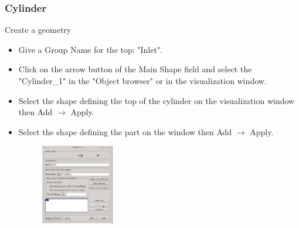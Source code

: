 \documentclass[10pt, hyperref={unicode=true,pdfusetitle, bookmarks=true,bookmarksnumbered=false,bookmarksopen=false, breaklinks=false,pdfborder={0 0 1},backref=true,colorlinks=true,linkcolor=darkblue,pageanchor}]{beamer}
\begin{document}
\begin{frame}
\frametitle{Cylinder}
\begin{block}{Create a geometry}

\begin{itemize}
\item Give a Group Name for the top: "Inlet".
\item Click on the arrow button of the Main Shape field and select the "Cylinder\_1" in the "Object browser" or in the visualization window.\\
\item Select the shape defining the top of the cylinder on the visualization window then Add $\rightarrow$ Apply.\\

\item Select the shape defining the part on the window then Add $\rightarrow$ Apply.\\
\begin{figure}
\includegraphics[width=0.3\textwidth]{PICTURES/salome3.jpg}
\end{figure}
\end{itemize}

\end{block}
\end{frame}
\end{document}
